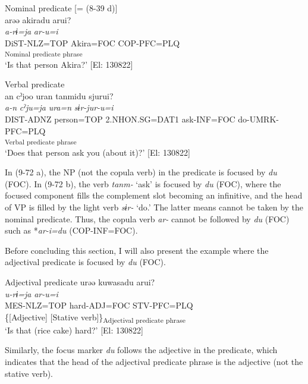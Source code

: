 \ea   \label{ex:9.72}
\ea Nominal predicate [= (8-39 d)]\\
 \gllll  arəə  akiradu  arui?\\
    \textit{a-rɨ=ja}  \textit{}  \textit{ar-u=i}\\
    DiST-NLZ=TOP  Akira=FOC  COP-PFC=PLQ\\
      [NP  Copula verb]\textsubscript{Nominal predicate phrase}\\
    \glt     ‘Is that person Akira?’ [El: 130822]

\ex Verbal predicate\\
 \gllll  an  cˀjoo  uran  tanmidu  sjurui?\\
    \textit{a-n}  \textit{cˀju=ja}  \textit{ura=n}  \textit{}  \textit{sɨr-jur-u=i}\\
    DIST{}-ADNZ  person=TOP  2.NHON.SG=DAT1  ask-INF=FOC  do-UMRK{}-PFC=PLQ\\
      [Complement  VP]\textsubscript{Verbal predicate phrase}\\
    \glt     ‘Does that person ask you (about it)?’ [El: 130822]
    \z
\z

In (9-72 a), the NP (not the copula verb) in the predicate is focused by \textit{du} (FOC). In (9-72 b), the verb \textit{tanm-} ‘ask’ is focused by \textit{du} (FOC), where the focused component fills the complement slot becoming an infinitive, and the head of VP is filled by the light verb \textit{sɨr-} ‘do.’ The latter means cannot be taken by the nominal predicate. Thus, the copula verb \textit{ar-} cannot be followed by \textit{du} (FOC) such as *\textit{ar-i=du} (COP-INF=FOC).

Before concluding this section, I will also present the example where the adjectival predicate is focused by \textit{du} (FOC).

\ea   Adjectival predicate \label{ex:9.73}
 \gllll  urəə  kuwasadu  arui?\\
    \textit{u-rɨ=ja}  \textit{}  \textit{ar-u=i}\\
    MES-NLZ=TOP  hard-ADJ=FOC  STV-PFC=PLQ\\
      \{[Adjective]  [Stative verb]\}\textsubscript{Adjectival predicate phrase}\\
    \glt     ‘Is that (rice cake) hard?’ [El: 130822]
\z

Similarly, the focus marker \textit{du} follows the adjective in the predicate, which indicates that the head of the adjectival predicate phrase is the adjective (not the stative verb).
